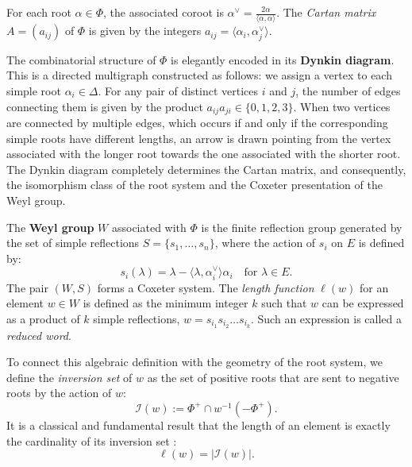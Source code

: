 \documentclass[11pt,a4paper]{amsart}
\theoremstyle{plain}
\theoremstyle{definition}
\theoremstyle{remark}
\begin{document}
For each root $\alpha \in \Phi$, the associated coroot is $\alpha^\vee = \frac{2\alpha}{\langle\alpha, \alpha\rangle}$. The \textit{Cartan matrix} $A = (a_{ij})$ of $\Phi$ is given by the integers $a_{ij} = \langle \alpha_i, \alpha_j^\vee \rangle$.

The combinatorial structure of $\Phi$ is elegantly encoded in its \textbf{Dynkin diagram}. This is a directed multigraph constructed as follows: we assign a vertex to each simple root $\alpha_i \in \Delta$. For any pair of distinct vertices $i$ and $j$, the number of edges connecting them is given by the product $a_{ij}a_{ji} \in \{0, 1, 2, 3\}$. When two vertices are connected by multiple edges, which occurs if and only if the corresponding simple roots have different lengths, an arrow is drawn pointing from the vertex associated with the longer root towards the one associated with the shorter root. The Dynkin diagram completely determines the Cartan matrix, and consequently, the isomorphism class of the root system and the Coxeter presentation of the Weyl group.

The \textbf{Weyl group} $W$ associated with $\Phi$ is the finite reflection group generated by the set of simple reflections $S = \{s_1, \dots, s_n\}$, where the action of $s_i$ on $E$ is defined by:
\begin{equation}
    s_i(\lambda) = \lambda - \langle \lambda, \alpha_i^\vee \rangle \alpha_i \quad \text{for } \lambda \in E.
\end{equation}
The pair $(W, S)$ forms a Coxeter system. The \textit{length function} $\ell(w)$ for an element $w \in W$ is defined as the minimum integer $k$ such that $w$ can be expressed as a product of $k$ simple reflections, $w = s_{i_1} s_{i_2} \dots s_{i_k}$. Such an expression is called a \textit{reduced word}. 

To connect this algebraic definition with the geometry of the root system, we define the \textit{inversion set} of $w$ as the set of positive roots that are sent to negative roots by the action of $w$:
\begin{equation}
    \mathcal{I}(w) := \Phi^+ \cap w^{-1}(-\Phi^+).
\end{equation}
It is a classical and fundamental result that the length of an element is exactly the cardinality of its inversion set \cite[(1.5)]{Humphreys1972}:
\begin{equation}
    \ell(w) = |\mathcal{I}(w)|.
\end{equation}


\end{document}
